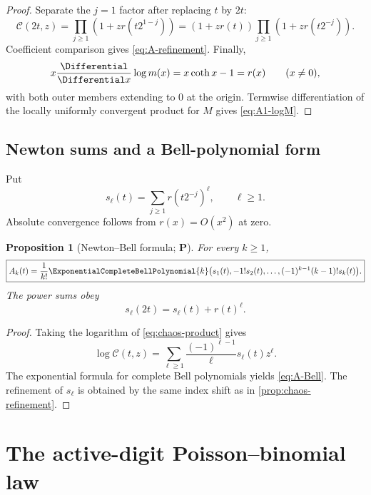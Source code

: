 \documentclass[11pt,oneside]{article}
\newtheorem{proposition}[theorem]{Proposition}
\theoremstyle{definition}
\theoremstyle{remark}
\newcommand{\Ccal}{\mathcal C}
\newcommand{\InteractionPowerSum}[1]{s_{#1}}
\newcommand{\statusP}{\textcolor{deepgreen}{\textbf{P}}}
\begin{document}
\begin{proof}
Separate the $j=1$ factor after replacing $t$ by $2t$:
\[
 \Ccal(2t,z)=\prod_{j\ge1}(1+zr(t2^{1-j}))
 =(1+zr(t))\prod_{j\ge1}(1+zr(t2^{-j})).
\]
Coefficient comparison gives \eqref{eq:A-refinement}.  Finally,
\[
 x\frac{\Differential}{\Differential x}\log m(x)=x\coth x-1=r(x)\qquad(x\ne0),
\]
with both outer members extending to $0$ at the origin.  Termwise
differentiation of the locally uniformly convergent product for $M$ gives
\eqref{eq:A1-logM}.
\end{proof}

\subsection{Newton sums and a Bell-polynomial form}

Put
\begin{equation}
 \InteractionPowerSum{\ell}(t)=\sum_{j\ge1}r(t2^{-j})^\ell,
 \qquad \ell\ge1.
 \label{eq:power-sums}
\end{equation}
Absolute convergence follows from $r(x)=O(x^2)$ at zero.

\begin{proposition}[Newton--Bell formula; \statusP]
\label{prop:Newton-Bell}
For every $k\ge1$,
\begin{equation}
 \boxed{
 A_k(t)=\frac1{k!}\ExponentialCompleteBellPolynomial{k}\bigl(\InteractionPowerSum{1}(t),-1!\InteractionPowerSum{2}(t),
 \ldots,(-1)^{k-1}(k-1)!\InteractionPowerSum{k}(t)\bigr).}
 \label{eq:A-Bell}
\end{equation}
The power sums obey
\begin{equation}
 \InteractionPowerSum{\ell}(2t)=\InteractionPowerSum{\ell}(t)+r(t)^\ell.
 \label{eq:s-refinement}
\end{equation}
\end{proposition}

\begin{proof}
Taking the logarithm of \eqref{eq:chaos-product} gives
\[
 \log\Ccal(t,z)
 =\sum_{\ell\ge1}\frac{(-1)^{\ell-1}}{\ell}s_\ell(t)z^\ell.
\]
The exponential formula for complete Bell polynomials yields
\eqref{eq:A-Bell}.  The refinement of $s_\ell$ is obtained by the same index
shift as in \cref{prop:chaos-refinement}.
\end{proof}

\section{The active-digit Poisson--binomial law}
\label{sec:active-law}
\end{document}
